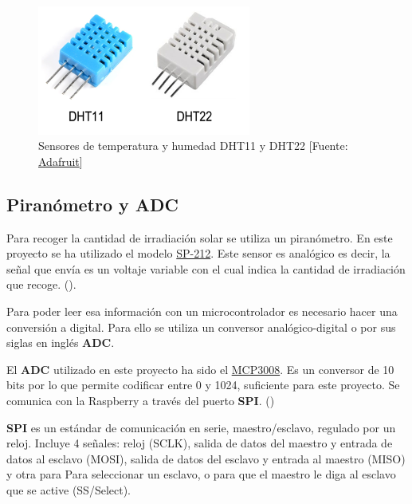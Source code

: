  \begin{figure}[htb]
	
	\begin{center}
		\includegraphics[width=7cm]{figures/sensorTemperaturaHumedad.png}
		\caption{Sensores de temperatura y humedad DHT11 y DHT22 [Fuente: \href{https://cdn-shop.adafruit.com/datasheets/Digital+humidity+and+temperature+sensor+AM2302.pdf}{Adafruit}]}
	\end{center}
	
	\label{sensor}
\end{figure} 

\subsection{Piranómetro y ADC}
\label{makereference2.3.3}
Para recoger la cantidad de irradiación solar se utiliza un piranómetro. En este proyecto se ha utilizado el modelo \href{https://www.apogeeinstruments.co.uk/content/SP-212-215-manual.pdf}{SP-212}. Este sensor es analógico es decir, la señal que envía es un voltaje variable con el cual indica la cantidad de irradiación que recoge. (\cite{ARP:Apogee:2017}).

Para poder leer esa información con un microcontrolador es necesario hacer una conversión a digital. Para ello se utiliza un conversor analógico-digital o por sus siglas en inglés \textbf{ADC}.

El \textbf{ADC} utilizado en este proyecto ha sido el \href{https://cdn-shop.adafruit.com/datasheets/MCP3008.pdf}{MCP3008}. Es un conversor de 10 bits por lo que permite codificar entre 0 y 1024, suficiente para este proyecto. Se comunica con la Raspberry a través del puerto \textbf{SPI}. (\cite{ARP:Adafruit:2017})

\textbf{SPI} es un estándar de comunicación en serie, maestro/esclavo, regulado por un reloj. Incluye 4 señales: reloj (SCLK), salida de datos del maestro y entrada de datos al esclavo (MOSI), salida de datos del esclavo y entrada al maestro (MISO) y otra para Para seleccionar un esclavo, o para que el maestro le diga al esclavo que se active (SS/Select).

